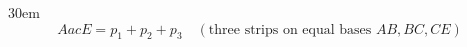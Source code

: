 \documentclass[border=4pt]{standalone}
\begin{document}
\begin{varwidth}{30em}
\large
\[ AacE = p_1 + p_2 + p_3 \quad (\text{three strips on equal bases } AB,BC,CE) \]

\end{varwidth}
\end{document}
